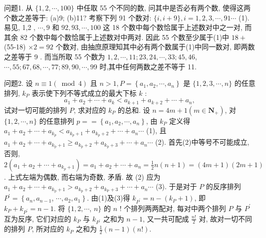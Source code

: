 
问题1. 从 $\{1,2, \cdots, 100\}$ 中任取 55 个不同的数, 问其中是否必有两个数, 使得这两个数之差等于: (a)9; (b)11?
考察下列 91 个数对: $\{i, i+9\}, i=1,2,3, \cdots, 91 \cdots$ (1). 易见, 1,2 , $\cdots, 9$ 和 $92,93, \cdots, 100$ 这 18 个数中每个数恰属于上述数对中之一对, 而其余 82 个数中每个数恰属于上述数对中两对.
因此 55 个数至少属于(1)中 $18+$ (55-18) $\times 2=92$ 个数对, 由抽庶原理知其中必有两个数属于(1)中同一数对, 即两数之差等于 9 . 而当所取 55 个数为 $1,2, \cdots, 11 ; 23,24, \cdots, 33 ; 45,46$, $\cdots, 55 ; 67,68, \cdots, 77 ; 89,90, \cdots, 99$ 时,其中任何两数之差不等于 11.



问题2. 设 $n \equiv 1(\bmod 4)$ 且 $n>1, P=\left\{a_1, a_2, \cdots, a_n\right\}$ 是 $\{1,2,3, \cdots, n\}$ 的任意排列, $k_P$ 表示使下列不等式成立的最大下标 $k$ :
$$
a_1+a_2+\cdots+a_k<a_{k+1}+a_{k+2}+\cdots+a_n,
$$
试对一切可能的排列 $P$, 求对应的 $k_P$ 的总和.
设 $n=4 m+1\left(m \in \mathbf{N}_{+}\right)$, 对 $\{1,2, \cdots, n\}$ 的任意排列 $p==\left\{a_1, a_2, \cdots, a_n\right\}$, 由 $k_P$ 定义得 $a_1+a_2+\cdots+a_{k_p}<a_{k_p+1}+a_{k_p+2}+\cdots+a_n \cdots$ (1), 
且 $a_1+a_2+\cdots+a_{k_{\mathrm{p}}+1} \geqslant a_{k_{\mathrm{p}}+2}+a_{k_{\mathrm{p}}+3}+\cdots+a_n \cdots$ (2). 
首先(2)中等号不可能成立, 否则, $2\left(a_1+a_2+\cdots+a_{k_p+1}\right)=a_1+a_2+\cdots+a_n=\frac{1}{2} n(n+1)=(4 m+1) (2 m+1)$. 上式左端为偶数, 而右端为奇数, 矛盾.
故 (2) 应为 $a_1+a_2+\cdots+ a_{k_{\mathrm{p}}+1}>a_{k_{\mathrm{p}}+2}+a_{k_{\mathrm{P}}+3}+\cdots+a_n \cdots$ (3). 
于是对于 $P$ 的反序排列 $P^{\prime}=\left\{a_n, a_{n-1}\right.$, $\left.\cdots, a_2, a_1\right\}$. 
由(1)及(3)得 $k_{P^{\prime}}=n-\left(k_P+1\right)$, 即 $k_P+k_{P^{\prime}}=n-1$. 
将 $\{1,2, \cdots$, $n\}$ 的 $n$ ! 个排列两两配对, 每对中两个排列 $P$ 与 $P^{\prime}$ 互为反序, 它们对应的 $k_P$ 与 $k_{P^{\prime}}$ 之和为 $n-1$, 又一共可配成 $\frac{n !}{2}$ 对, 
故对一切不同的排列 $P$, 所对应的 $k_P$ 之和为 $\frac{1}{2}(n-1)(n !)$.



